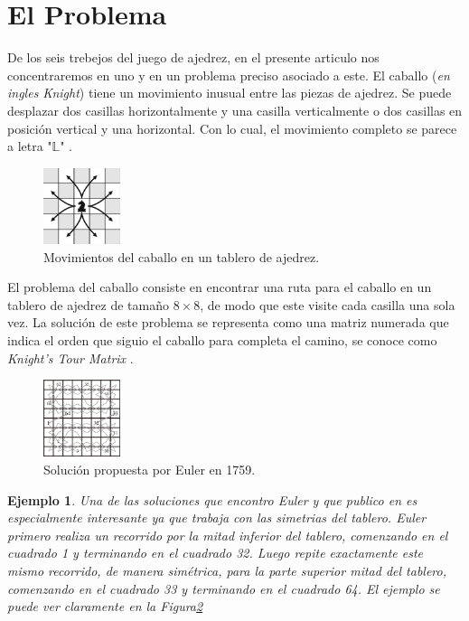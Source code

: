 \documentclass[journal, 10pt]{IEEEtran}
\newtheorem{example}{Ejemplo}
\begin{document}
\section{El Problema}
De los seis trebejos del juego de ajedrez, en el presente articulo nos concentraremos en uno y en un problema preciso asociado a este. El caballo (\textit{en ingles Knight}) tiene un movimiento inusual entre las piezas de ajedrez. Se puede desplazar dos casillas horizontalmente y una casilla verticalmente o dos casillas en posición vertical y una horizontal. Con lo cual, el movimiento completo se parece a letra "$\mathbb{L}$"  \cite{Uehara:2019}.

\begin{figure}[h]

\centering
\includegraphics[width=0.2\textwidth]{figures/k_moves.png}
\caption{Movimientos del caballo en un tablero de ajedrez.}
\label{fig:moves}

\end{figure}

El problema del caballo consiste en encontrar una ruta para el caballo en un tablero de ajedrez de tamaño $8 \times 8$, de modo que este visite cada casilla una sola vez. La soluci\'on de este problema se representa como una matriz numerada que indica el orden que siguio el caballo para completa el camino, se conoce como \textit{Knight's Tour Matrix} \cite{Kopec:2016}.

\begin{figure}[h]

\centering
\includegraphics[width=0.2\textwidth]{figures/EulerKT.png}
\caption{Soluci\'on propuesta por Euler en 1759.}
\label{fig:euler}

\end{figure}

\begin{example}
	Una de las soluciones que encontro Euler y que publico en \cite{Euler:1759} es especialmente interesante ya que trabaja con las simetrias del tablero. Euler primero realiza un recorrido  por la mitad inferior del tablero, comenzando en el cuadrado 1 y terminando en el cuadrado 32. Luego repite exactamente este mismo recorrido, de manera sim\'etrica, para la parte superior mitad del tablero, comenzando en el cuadrado 33 y terminando en el cuadrado 64. El ejemplo se puede ver claramente en la \textit{Figura\ref{fig:euler}} 
\end{example}
\end{document}
